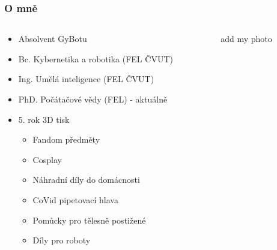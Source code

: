 \begin{frame}
    \frametitle{O mně}

    \begin{columns}[T, onlytextwidth]
        \begin{column}[T]{0.6\textwidth}
            \begin{itemize}
                \item Absolvent GyBotu
                \item Bc. Kybernetika a robotika (FEL ČVUT)
                \item Ing. Umělá inteligence (FEL ČVUT)
                \item PhD. Počátačové vědy (FEL) - aktuálně
                \item 5. rok 3D tisk
                \begin{itemize}
                    \item Fandom předměty
                    \item Cosplay
                    \item Náhradní díly do domácnosti
                    \item CoVid pipetovací hlava
                    \item Pomůcky pro tělesně postižené
                    \item Díly pro roboty
                \end{itemize}
            \end{itemize}
        \end{column}

        \begin{column}[T]{0.4\textwidth}
            \todotext add my photo
        \end{column}
        
    \end{columns}

\end{frame}
